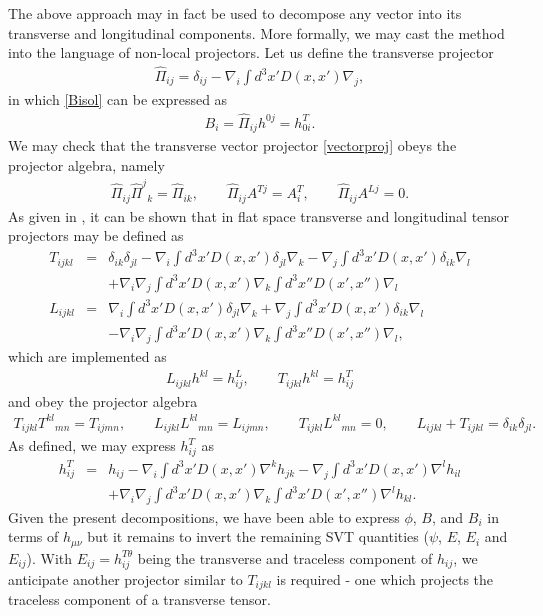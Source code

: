 \documentclass[10pt,letterpaper]{article}
\numberwithin{equation}{section}
\begin{document}
\indent The above approach may in fact be used to decompose any vector into its transverse and longitudinal components. More formally, we may cast the method into the language of non-local projectors. Let us define the transverse projector
\begin{eqnarray}
\hat\Pi_{ij}  = \delta_{ij} - \nabla_i \int d^3x' D(x,x')\nabla_j,
\label{vectorproj}
\end{eqnarray}
in which \eqref{Bisol} can be expressed as
\begin{eqnarray}
B_i = \hat\Pi_{ij}h^{0j} = h_{0i}^T. 
\end{eqnarray}
We may check that the transverse vector projector \eqref{vectorproj} obeys the projector algebra, namely
\begin{eqnarray}
\hat\Pi_{ij}\hat\Pi^{j}{}_k = \hat\Pi_{ik},\qquad \hat\Pi_{ij}A^{Tj} = A_i^T,\qquad \hat\Pi_{ij}A^{Lj} = 0. 
\end{eqnarray}
As given in \cite{Mannheim2005}, it can be shown that in flat space transverse and longitudinal tensor projectors may be defined as
\begin{eqnarray}
T_{ijkl} &=& \delta_{ik}\delta_{jl} - \nabla_i \int d^3x' D(x,x') \delta_{jl}\nabla_k - \nabla_j \int d^3x' D(x,x')\delta_{ik}\nabla_l
\nonumber\\
&&+\nabla_i\nabla_j \int d^3x' D(x,x')\nabla_k \int d^3x'' D(x',x'')\nabla_l
\\ 
L_{ijkl} &=&   \nabla_i \int d^3x' D(x,x') \delta_{jl}\nabla_k +  \nabla_j \int d^3x' D(x,x')\delta_{ik}\nabla_l\nonumber\\
&&-\nabla_i\nabla_j \int d^3x' D(x,x')\nabla_k \int d^3x'' D(x',x'')\nabla_l,
\end{eqnarray}
which are implemented as
\begin{eqnarray}
L_{ijkl}h^{kl} = h_{ij}^L,\qquad T_{ijkl}h^{kl} = h^T_{ij}
\end{eqnarray}
and obey the projector algebra
\begin{eqnarray}
T_{ijkl}T^{kl}{}_{mn} = T_{ijmn},\qquad L_{ijkl}L^{kl}{}_{mn} = L_{ijmn},
\qquad T_{ijkl}L^{kl}{}_{mn} = 0,\qquad L_{ijkl} + T_{ijkl}= \delta_{ik}\delta_{jl}.
\end{eqnarray}
As defined, we may express $h^T_{ij}$ as
\begin{eqnarray}
h_{ij}^T &=& h_{ij} - \nabla_i \int d^3x' D(x,x') \nabla^k h_{jk} - \nabla_j \int d^3x' D(x,x')\nabla^l h_{il}
\nonumber\\
&&+\nabla_i\nabla_j \int d^3x' D(x,x')\nabla_k \int d^3x' D(x',x'')\nabla^l h_{kl}.
\end{eqnarray}
Given the present decompositions, we have been able to express $\phi$, $B$, and $B_i$ in terms of $h_{\mu\nu}$ but it remains to invert the remaining SVT quantities ($\psi$, $E$, $E_i$ and $E_{ij}$). With $E_{ij}=h_{ij}^{T\theta}$ being the transverse and traceless component of $h_{ij}$, we anticipate another projector similar to $T_{ijkl}$ is required - one which projects the traceless component of a transverse tensor. 
\end{document}
